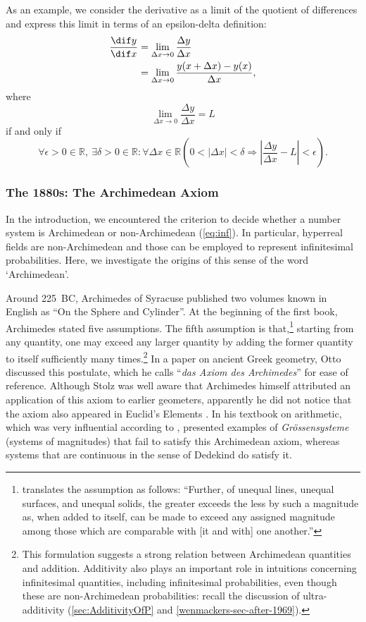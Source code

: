 As an example, we consider the derivative as a limit of the quotient of differences and express this limit in terms of an epsilon-delta definition:
\begin{align*}
\frac{\dif y}{\dif x} &= \lim_{\Delta x\rightarrow0} \frac{\Delta y}{\Delta x}\\
 &= \lim_{\Delta x\rightarrow0} \frac{y(x+\Delta x) - y(x)}{\Delta x},
\end{align*}
where
$$\lim_{\Delta x\rightarrow0} \frac{\Delta y}{\Delta x} = L$$
if and only if
$$\forall \epsilon > 0 \in \mathbb{R}, \ \exists \delta > 0 \in \mathbb{R}: \forall \Delta x \in \mathbb{R} \left( 0 < |\Delta x| < \delta \Rightarrow | \frac{\Delta y}{\Delta x} - L| < \epsilon \right).$$

\subsubsection*{The 1880s: The Archimedean Axiom}
In the introduction, we encountered the criterion to decide whether a number system is Archimedean or non-Archimedean (\autoref{eq:inf}).
In particular, hyperreal fields are non-Archimedean and those can be employed to represent infinitesimal probabilities.
Here, we investigate the origins of this sense of the word `Archimedean'.

Around 225~BC, Archimedes of Syracuse published two volumes known in English as ``On the Sphere and Cylinder''. At the beginning of the first book, Archimedes stated five assumptions. The fifth assumption is that,\footnote{\citet[p.~4]{Heath:1897} translates the assumption as follows: ``Further, of unequal lines, unequal surfaces, and unequal solids, the greater exceeds the less by such a magnitude as, when added to itself, can be made to exceed any assigned magnitude among those which are comparable with [it and with] one another.''} starting from any quantity, one may exceed any larger quantity by adding the former quantity to itself sufficiently many times.\footnote{This formulation suggests a strong relation between Archimedean quantities and addition. Additivity also plays an important role in intuitions concerning infinitesimal quantities, including infinitesimal probabilities, even though these are non-Archimedean probabilities: recall the discussion of ultra-additivity (\autoref{sec:AdditivityOfP} and \autoref{wenmackers-sec-after-1969}).}
In a paper on ancient Greek geometry, Otto \citet{Stolz:1883} discussed this postulate, which he calls ``\textit{das Axiom des Archimedes}'' for ease of reference. Although Stolz was well aware that Archimedes himself attributed an application of this axiom to earlier geometers, apparently he did not notice that the axiom also appeared in Euclid's Elements \citep[p.~888]{Bair-etal:2013}.
In his textbook on arithmetic, which was very influential according to \citet[p.~5]{Ehrlich:2006}, \citet{Stolz:1885} presented examples of \textit{Gr{\"o}ssensysteme} (systems of magnitudes) that fail to satisfy this Archimedean axiom, whereas systems that are continuous in the sense of Dedekind do satisfy it.

